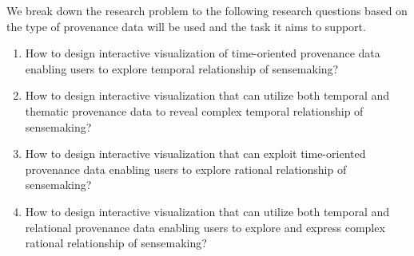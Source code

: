%

We break down the research problem to the following research questions based on the type of provenance data will be used and the task it aims to support.

\begin{enumerate}
	\item How to design interactive visualization of time-oriented provenance data enabling users to explore temporal relationship of sensemaking?
	
	\item How to design interactive visualization that can utilize both temporal and thematic provenance data to reveal complex temporal relationship of sensemaking?	
	
	\item How to design interactive visualization that can exploit time-oriented provenance data enabling users to explore rational relationship of sensemaking?
	
	\item How to design interactive visualization that can utilize both temporal and relational provenance data enabling users to explore and express complex rational relationship of sensemaking?				
\end{enumerate}

